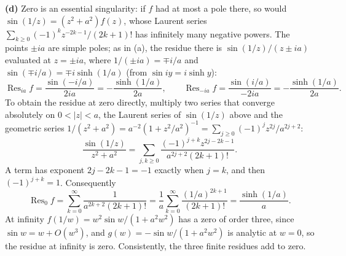\textbf{(d)} Zero is an essential singularity: if $f$ had at most a
pole there, so would $\sin(1/z)=(z^2+a^2)f(z)$, whose Laurent series
$\sum_{k\ge0}(-1)^kz^{-2k-1}/(2k+1)!$ has infinitely many negative
powers. The points $\pm ia$ are simple poles; as in (a), the residue
there is $\sin(1/z)/(z\pm ia)$ evaluated at $z=\pm ia$, where
$1/(\pm ia)=\mp i/a$ and $\sin(\mp i/a)=\mp i\sinh(1/a)$ (from
$\sin iy=i\sinh y$):
\[
\operatorname{Res}_{ia}f
=\frac{\sin(-i/a)}{2ia}
=-\frac{\sinh(1/a)}{2a},\qquad
\operatorname{Res}_{-ia}f
=\frac{\sin(i/a)}{-2ia}
=-\frac{\sinh(1/a)}{2a}.
\]
To obtain the residue at zero directly, multiply two series that
converge absolutely on $0<|z|<a$, the Laurent series of $\sin(1/z)$
above and the geometric series
$1/(z^2+a^2)=a^{-2}(1+z^2/a^2)^{-1}=\sum_{j\ge0}(-1)^jz^{2j}/a^{2j+2}$:
\[
\frac{\sin(1/z)}{z^2+a^2}
=\sum_{j,k\ge0}
\frac{(-1)^{j+k}z^{2j-2k-1}}{a^{2j+2}(2k+1)!}.
\]
A term has exponent $2j-2k-1=-1$ exactly when $j=k$, and then
$(-1)^{j+k}=1$. Consequently
\[
\boxed{\operatorname{Res}_{0}f
=\sum_{k=0}^{\infty}\frac1{a^{2k+2}(2k+1)!}
=\frac1a\sum_{k=0}^{\infty}\frac{(1/a)^{2k+1}}{(2k+1)!}
=\frac{\sinh(1/a)}a}.
\]
At infinity $f(1/w)=w^2\sin w/(1+a^2w^2)$ has a zero of order three,
since $\sin w=w+O(w^3)$, and $g(w)=-\sin w/(1+a^2w^2)$ is analytic at
$w=0$, so the residue at infinity is zero. Consistently, the three
finite residues add to zero.

